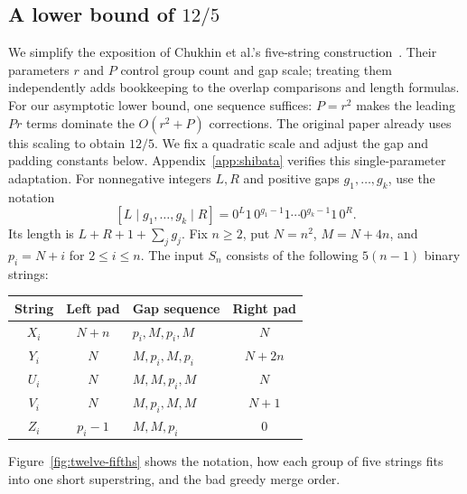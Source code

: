\documentclass[11pt,a4paper]{article}   %
\theoremstyle{compact}
\theoremstyle{compactdef}
\begin{document}
\subsection{A lower bound of \texorpdfstring{$12/5$}{12/5}}\label{sec:lower-twelve-fifths}

We simplify the exposition of Chukhin et al.'s five-string
construction~\cite[Section 4]{GSC26}. Their parameters $r$ and $P$
control group count and gap scale; treating them independently adds
bookkeeping to the overlap comparisons and length formulas. For our
asymptotic lower bound, one sequence suffices: $P=r^2$ makes the leading
$Pr$ terms dominate the $O(r^2+P)$ corrections. The original paper
already uses this scaling to obtain $12/5$. We fix a quadratic scale
and adjust the gap and padding constants below.
Appendix~\ref{app:shibata} verifies this single-parameter adaptation.
For nonnegative integers $L,R$ and positive gaps
$g_1,\ldots,g_k$, use the notation
\[
 [L\mid g_1,\ldots,g_k\mid R]
 =0^L1\,0^{g_1-1}1\cdots0^{g_k-1}1\,0^R.
\]
Its length is $L+R+1+\sum_jg_j$. Fix $n\ge2$, put
$N=n^2$, $M=N+4n$, and $p_i=N+i$ for $2\le i\le n$.
The input $S_n$ consists of the following $5(n-1)$ binary strings:
\begin{center}
\begin{tabular}{cclc}
\toprule
String & Left pad & Gap sequence & Right pad\\
\midrule
$X_i$ & $N+n$ & $p_i,M,p_i,M$ & $N$\\
$Y_i$ & $N$ & $M,p_i,M,p_i$ & $N+2n$\\
$U_i$ & $N$ & $M,M,p_i,M$ & $N$\\
$V_i$ & $N$ & $M,p_i,M,M$ & $N+1$\\
$Z_i$ & $p_i-1$ & $M,M,p_i$ & $0$\\
\bottomrule
\end{tabular}
\end{center}
Figure~\ref{fig:twelve-fifths} shows the notation, how each group of five
strings fits into one short superstring, and the bad greedy merge order.
\end{document}

